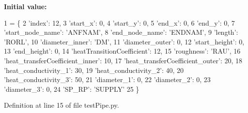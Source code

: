{\bfseries Initial value\+:}
\begin{DoxyCode}
1 =  \{
2              \textcolor{stringliteral}{'index'}: 12,
3              \textcolor{stringliteral}{'start\_x'}: 0,
4              \textcolor{stringliteral}{'start\_y'}: 0,
5              \textcolor{stringliteral}{'end\_x'}: 0,
6              \textcolor{stringliteral}{'end\_y'}: 0,
7              \textcolor{stringliteral}{'start\_node\_name'}: \textcolor{stringliteral}{'ANFNAM'},
8              \textcolor{stringliteral}{'end\_node\_name'}: \textcolor{stringliteral}{'ENDNAM'},
9              \textcolor{stringliteral}{'length'}: \textcolor{stringliteral}{'RORL'},
10              \textcolor{stringliteral}{'diameter\_inner'}: \textcolor{stringliteral}{'DM'},
11              \textcolor{stringliteral}{'diameter\_outer'}: 0,
12              \textcolor{stringliteral}{'start\_height'}: 0,
13              \textcolor{stringliteral}{'end\_height'}: 0,
14              \textcolor{stringliteral}{'heatTransitionCoefficient'}: 12,
15              \textcolor{stringliteral}{'roughness'}: \textcolor{stringliteral}{'RAU'},
16              \textcolor{stringliteral}{'heat\_transferCoefficient\_inner'}: 10,
17              \textcolor{stringliteral}{'heat\_transferCoefficient\_outer'}: 20,
18              \textcolor{stringliteral}{'heat\_conductivity\_1'}: 30,
19              \textcolor{stringliteral}{'heat\_conductivity\_2'}: 40,
20              \textcolor{stringliteral}{'heat\_conductivity\_3'}: 50,
21              \textcolor{stringliteral}{'diameter\_1'}: 0,
22              \textcolor{stringliteral}{'diameter\_2'}: 0,
23              \textcolor{stringliteral}{'diameter\_3'}: 0,
24              \textcolor{stringliteral}{'SP\_RP'}: \textcolor{stringliteral}{'SUPPLY'}
25              \}
\end{DoxyCode}


Definition at line 15 of file test\+Pipe.\+py.

